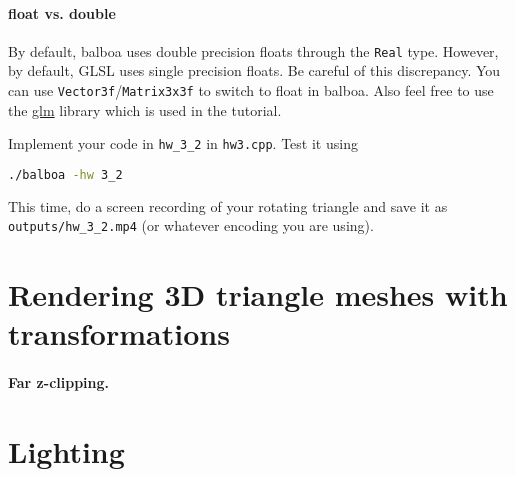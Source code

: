 \paragraph{float vs. double} By default, balboa uses double precision floats through the \lstinline{Real} type. However, by default, GLSL uses single precision floats. Be careful of this discrepancy. You can use \lstinline{Vector3f}/\lstinline{Matrix3x3f} to switch to float in balboa. Also feel free to use the \href{https://github.com/g-truc/glm}{glm} library which is used in the tutorial.

Implement your code in \lstinline{hw_3_2} in \lstinline{hw3.cpp}. Test it using
\begin{lstlisting}[language=bash]
./balboa -hw 3_2
\end{lstlisting}

This time, do a screen recording of your rotating triangle and save it as \lstinline{outputs/hw_3_2.mp4} (or whatever encoding you are using).

\section{Rendering 3D triangle meshes with transformations}

\paragraph{Far z-clipping.}

\section{Lighting}

%
%


